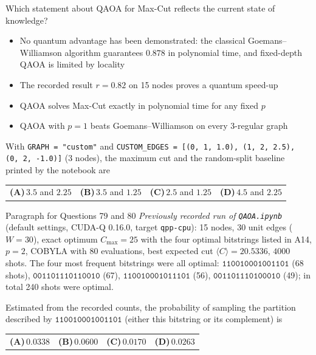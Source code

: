 \documentclass[11pt,a4paper]{article}
\newcommand{\optlabel}[1]{\textbf{(#1)}}
\newenvironment{qitem}[1]{\begin{list}{}{\setlength{\leftmargin}{3.3em}\setlength{\labelwidth}{3.1em}%
  \setlength{\labelsep}{0.2em}\setlength{\topsep}{3pt}\setlength{\parsep}{3pt}}\item[\textbf{Q.#1}\hfill]}{\end{list}}
\newcommand{\qsep}{\par\vspace{2pt}{\color{black!15}\hrule}\vspace{4pt}}
\begin{document}
\begin{qitem}{77}
Which statement about QAOA for Max-Cut reflects the current state of knowledge?
\begin{itemize}[leftmargin=2.6em, labelsep=0.4em, itemsep=2pt, topsep=3pt]
\item[\optlabel{A}] No quantum advantage has been demonstrated: the classical Goemans--Williamson algorithm guarantees $0.878$ in polynomial time, and fixed-depth QAOA is limited by locality
\item[\optlabel{B}] The recorded result $r = 0.82$ on 15 nodes proves a quantum speed-up
\item[\optlabel{C}] QAOA solves Max-Cut exactly in polynomial time for any fixed $p$
\item[\optlabel{D}] QAOA with $p = 1$ beats Goemans--Williamson on every 3-regular graph
\end{itemize}
\end{qitem}
\qsep

\begin{qitem}{78}
With \texttt{GRAPH = "custom"} and \texttt{CUSTOM\_EDGES = [(0, 1, 1.0), (1, 2, 2.5), (0, 2, -1.0)]} (3 nodes), the maximum cut and
the random-split baseline printed by the notebook are
\par\smallskip\noindent\begin{tabularx}{\linewidth}{@{}*{4}{L}@{}}
\optlabel{A}\,$3.5$ and $2.25$ & \optlabel{B}\,$3.5$ and $1.25$ & \optlabel{C}\,$2.5$ and $1.25$ & \optlabel{D}\,$4.5$ and $2.25$
\end{tabularx}
\end{qitem}
\qsep

\begin{passagebox}{Paragraph for Questions 79 and 80}
\emph{Previously recorded run of \texttt{QAOA.ipynb}} (default settings, CUDA-Q 0.16.0, target \texttt{qpp-cpu}):
15 nodes, 30 unit edges ($W = 30$), exact optimum $C_{\max} = 25$ with the four optimal bitstrings listed in A14,
$p = 2$, COBYLA with 80 evaluations, best expected cut $\langle C\rangle = 20.5336$, $4000$ shots. The four most frequent
bitstrings were all optimal:
$\texttt{110010001001101}$ (68 shots), $\texttt{001101110110010}$ (67), $\texttt{110010001011101}$ (56), $\texttt{001101110100010}$ (49);
in total 240 shots were optimal.
\end{passagebox}
\begin{qitem}{79}
Estimated from the recorded counts, the probability of sampling the partition described by $\texttt{110010001001101}$
(either this bitstring or its complement) is
\par\smallskip\noindent\begin{tabularx}{\linewidth}{@{}*{4}{L}@{}}
\optlabel{A}\,$0.0338$ & \optlabel{B}\,$0.0600$ & \optlabel{C}\,$0.0170$ & \optlabel{D}\,$0.0263$
\end{tabularx}
\end{qitem}
\qsep
\end{document}
